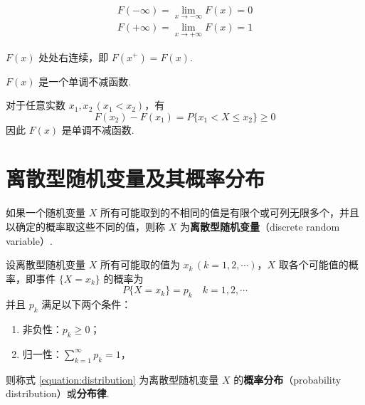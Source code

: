 \begin{property}
    \begin{gather*}
        F(-\infty)= \lim_{x \to -\infty} F(x)=0\\
        F(+\infty)= \lim_{x \to +\infty} F(x)=1
    \end{gather*}
\end{property}

\begin{property}
    $F(x)$ 处处右连续，即 $F(x^+)=F(x)$.
\end{property}

\begin{property}
    $F(x)$ 是一个单调不减函数.
\end{property}

\begin{myproof}
    对于任意实数 $x_1,x_2\, (x_1<x_2)$，有
    $$
    F(x_2)-F(x_1) = P\{x_1 < X \leqslant x_2\} \geqslant 0
    $$
    因此 $F(x)$ 是单调不减函数.
\end{myproof}

\section{离散型随机变量及其概率分布}

\begin{definition}
    如果一个随机变量 $X$ 所有可能取到的不相同的值是有限个或可列无限多个，并且以确定的概率取这些不同的值，则称 $X$ 为\textbf{离散型随机变量}（discrete random variable）.
\end{definition}

\begin{definition}
    设离散型随机变量 $X$ 所有可能取的值为 $x_k\, (k=1,2,\cdots)$，$X$ 取各个可能值的概率，即事件 $\{X=x_k\}$ 的概率为
    \begin{equation} \label{equation:distribution}
        P\{X=x_k\} = p_k \quad k=1,2,\cdots
    \end{equation}
    并且 $p_k$ 满足以下两个条件：
    \begin{enumerate}
        \item 非负性：$p_k \geqslant 0$；\vspace{0.5em}
        \item 归一性：$\displaystyle\sum_{k=1}^\infty p_k=1$，
    \end{enumerate} \vspace{0.5em}
    则称式 \eqref{equation:distribution} 为离散型随机变量 $X$ 的\textbf{概率分布}（probability distribution）或\textbf{分布律}.
\end{definition}

